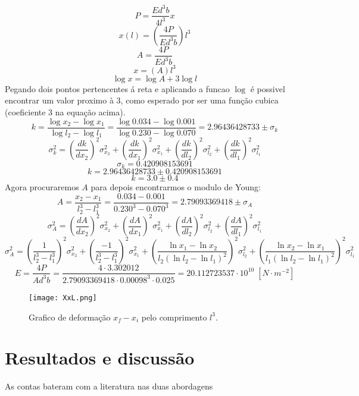 \documentclass{article}
\begin{document}
\[P = \frac{Ed^3b}{4l^3}x\]
\[x(l) = \left(\frac{4P}{Ed^3b}\right)l^3\]
\[A = \frac{4P}{Ed^3b}\]
\[x = (A)l^3\]
\[\log{x} = \log{A} + 3\log{l}\]
Pegando dois pontos pertencentes á reta e aplicando a funcao $\log$ é possivel encontrar um valor proximo à $3$, como esperado por ser uma função cubica (coeficiente $3$ na equação acima).
\[k = \frac{\log{x_2}-\log{x_1}}{\log{l_2}-\log{l_1}} = \frac{\log{0.034}-\log{0.001}}{\log{0.230}-\log{0.070}} = 2.96436428733\pm\sigma_{k}\]
\[\sigma_k^2 = \left(\frac{dk}{dx_2}\right)^2\sigma_{x_2}^2 + \left(\frac{dk}{dx_1}\right)^2\sigma_{x_1}^2 + \left(\frac{dk}{dl_2}\right)^2\sigma_{l_2}^2 + \left(\frac{dk}{dl_1}\right)^2\sigma_{l_1}^2\]
\[\sigma_k = 0.420908153691\]
\[k = 2.96436428733\pm0.420908153691\]
\[k = 3.0\pm0.4\]
Agora procuraremos $A$ para depois encontrarmos o modulo de Young:
\[A = \frac{x_2-x_1}{l_2^3-l_1^3} = \frac{0.034-0.001}{0.230^3-0.070^3} = 2.79093369418\pm\sigma_A\]
\[\sigma_A^2 = \left(\frac{dA}{dx_2}\right)^2\sigma_{x_2}^2 + \left(\frac{dA}{dx_1}\right)^2\sigma_{x_1}^2 + \left(\frac{dA}{dl_2}\right)^2\sigma_{l_2}^2 + \left(\frac{dA}{dl_1}\right)^2\sigma_{l_1}^2\]
\[\sigma_A^2 = \left(\frac{1}{l_2^3-l_1^3}\right)^2\sigma_{x_2}^2 + \left(\frac{-1}{l_2^3-l_1^3}\right)^2\sigma_{x_1}^2 + \left(\frac{\ln{x_1}-\ln{x_2}}{l_2(\ln{l_2}-\ln{l_1})^2}\right)^2\sigma_{l_2}^2 + \left(\frac{\ln{x_2}-\ln{x_1}}{l_1(\ln{l_2}-\ln{l_1})^2}\right)^2\sigma_{l_1}^2\]
\[E = \frac{4P}{Ad^3b} = \frac{4\cdot3.302012}{2.79093369418\cdot0.00098^3\cdot0.025} = 20.112723537\cdot{10}^{10}\;\left[N\cdot m^{-2}\right]\]


\begin{figure}[!ht]
    \centering
     \caption{Grafico de deformação $x_f - x_i$ pelo comprimento $l^3$.}
    \label{gra:XxL}
    \texttt{[image: XxL.png]}
\end{figure}



\section{Resultados e discussão}

\indent

As contas bateram com a literatura nas duas abordagens
\end{document}
